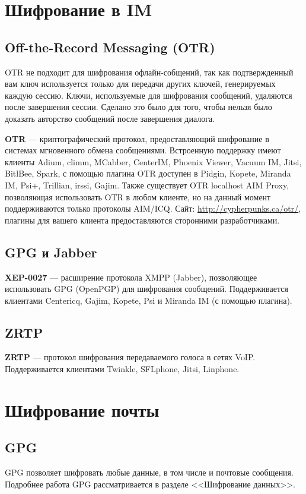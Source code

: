 \section{Шифрование в IM}
\subsection{Off-the-Record Messaging (OTR)}
\begin{important}
OTR не подходит для шифрования офлайн-собщений, так как подтвержденный вам ключ используется только для передачи других ключей, генерируемых каждую сессию. Ключи, используемые для шифрования сообщений, удаляются после завершения сессии. Сделано это было для того, чтобы нельзя было доказать авторство сообщений после завершения диалога.
\end{important}
\textbf{OTR} --- криптографический протокол, предоставляющий шифрование в системах мгновенного обмена сообщениями. Встроенную поддержку имеют клиенты Adium, climm, MCabber, CenterIM, Phoenix Viewer, Vacuum IM, Jitsi, BitlBee, Spark, с помощью плагина OTR доступен в Pidgin\cite{otr-pidgin}, Kopete\cite{otr-kopete}, Miranda IM\cite{otr-miranda}, Psi+\cite{otr-psi}, Trillian\cite{otr-trillian}, irssi\cite{otr-irssi}, Gajim\cite{otr-gajim}. Также существует OTR localhost AIM Proxy, позволяющая использовать OTR в любом клиенте, но на данный момент поддерживаются только протоколы AIM/ICQ. Сайт: \url{http://cypherpunks.ca/otr/}, плагины для вашего клиента предоставляются сторонними разработчиками.
\subsection{GPG и Jabber}
\textbf{XEP-0027} --- расширение протокола XMPP (Jabber), позволяющее использовать GPG (OpenPGP) для шифрования сообщений\cite{xep-0027}. Поддерживается клиентами Centericq, Gajim, Kopete, Psi и Miranda IM (с помощью плагина).
\subsection{ZRTP}
\textbf{ZRTP} --- протокол шифрования передаваемого голоса в сетях VoIP. Поддерживается клиентами Twinkle, SFLphone, Jitsi, Linphone.

\section{Шифрование почты}
\subsection{GPG}
GPG позволяет шифровать любые данные, в том числе и почтовые сообщения. Подробнее работа GPG рассматривается в разделе <<Шифрование данных>>.
